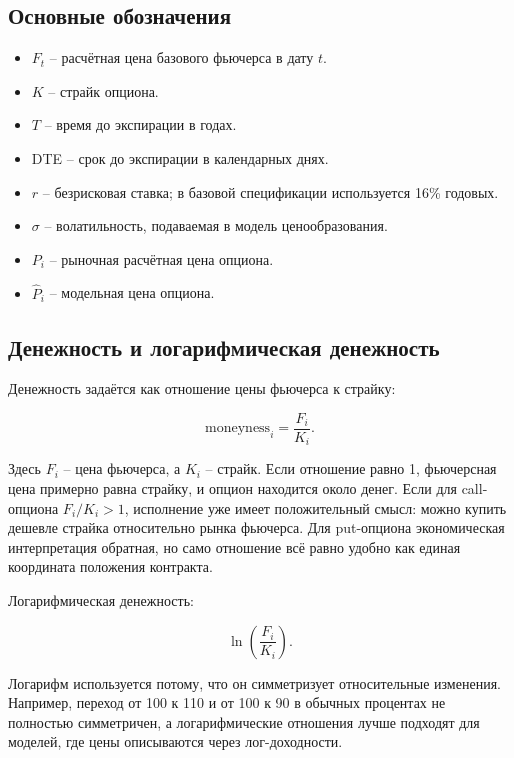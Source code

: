 \documentclass[11pt,a4paper]{article}
\begin{document}
\subsection{Основные обозначения}

\begin{itemize}
    \item $F_t$ -- расчётная цена базового фьючерса в дату $t$.
    \item $K$ -- страйк опциона.
    \item $T$ -- время до экспирации в годах.
    \item DTE -- срок до экспирации в календарных днях.
    \item $r$ -- безрисковая ставка; в базовой спецификации используется 16\% годовых.
    \item $\sigma$ -- волатильность, подаваемая в модель ценообразования.
    \item $P_i$ -- рыночная расчётная цена опциона.
    \item $\widehat{P}_i$ -- модельная цена опциона.
\end{itemize}

\subsection{Денежность и логарифмическая денежность}

Денежность задаётся как отношение цены фьючерса к страйку:

\begin{equation}
\text{moneyness}_i = \frac{F_i}{K_i}.
\end{equation}

Здесь $F_i$ -- цена фьючерса, а $K_i$ -- страйк. Если отношение равно 1, фьючерсная цена примерно равна страйку, и опцион находится около денег. Если для call-опциона $F_i/K_i>1$, исполнение уже имеет положительный смысл: можно купить дешевле страйка относительно рынка фьючерса. Для put-опциона экономическая интерпретация обратная, но само отношение всё равно удобно как единая координата положения контракта.

Логарифмическая денежность:

\begin{equation}
\ln\left(\frac{F_i}{K_i}\right).
\end{equation}

Логарифм используется потому, что он симметризует относительные изменения. Например, переход от 100 к 110 и от 100 к 90 в обычных процентах не полностью симметричен, а логарифмические отношения лучше подходят для моделей, где цены описываются через лог-доходности.
\end{document}
